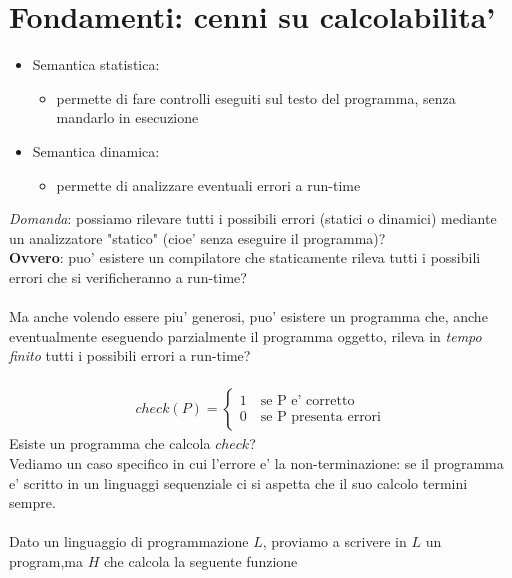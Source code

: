 \documentclass[a4paper,12pt]{article}
\begin{document}
{\section{Fondamenti: cenni su calcolabilita'}
\begin{itemize}
  \item Semantica statistica: 
  \begin{itemize}
    \item permette di fare controlli eseguiti sul testo del programma, senza mandarlo in esecuzione
  \end{itemize}
  \item Semantica dinamica:
  \begin{itemize}
    \item permette di analizzare eventuali errori a run-time
  \end{itemize}
\end{itemize}
\textit{Domanda}: possiamo rilevare tutti i possibili errori (statici o dinamici) mediante un analizzatore "statico" (cioe' senza eseguire il programma)? \\
\textbf{Ovvero}: puo' esistere un compilatore che staticamente rileva tutti i possibili errori che si verificheranno a run-time? \\
\vspace{5px}\\
Ma anche volendo essere piu' generosi, puo' esistere un programma che, anche eventualmente eseguendo parzialmente il programma oggetto, rileva in \textit{tempo finito} tutti i possibili errori a run-time? \\
\vspace{5px}\\
\begin{align*}
  check(P) = \begin{cases}
    1 \quad \text{se P e' corretto} \\
    0 \quad \text{se P presenta errori}
  \end{cases}
\end{align*}
Esiste un programma che calcola $check$? \\
Vediamo un caso specifico in cui l'errore e' la non-terminazione: se il programma e' scritto in un linguaggi sequenziale ci si aspetta che il suo calcolo termini sempre. \\
\vspace{5px} \\
Dato un linguaggio di programmazione $L$, proviamo a scrivere in $L$ un program,ma $H$ che calcola la seguente funzione
\begin{align*}

\end{align*}}
\end{document}
